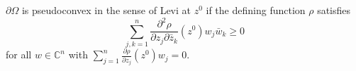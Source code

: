 
$\partial \Omega$ is pseudoconvex in the sense of Levi at $z^0$ if the defining function $\rho$ satisfies
$$\sum_{j,k=1}^{n} \frac{\partial^2 \rho}{\partial z_j \partial \bar{z}_k}(z^0) w_j \bar{w}_k \geq 0$$
for all $w \in \mathbb{C}^n$ with $\sum_{j=1}^{n} \frac{\partial \rho}{\partial z_j}(z^0) w_j = 0$.
